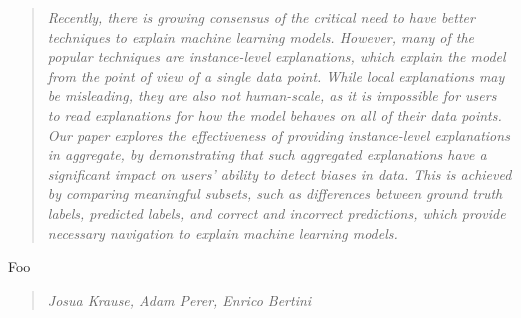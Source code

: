 \begin{quote}\textit{
Recently, there is growing consensus of the critical need to have better techniques to explain machine learning models.  However, many of the popular techniques are instance-level explanations, which explain the model from the point of view of a single data point.  While local explanations may be misleading, they are also not human-scale, as it is impossible for users to read explanations for how the model behaves on all of their data points.  Our paper explores the effectiveness of providing instance-level explanations in aggregate, by demonstrating that such aggregated explanations have a significant impact on users' ability to detect biases in data.
This is achieved by comparing meaningful subsets, such as differences between ground truth labels, predicted labels, and correct and incorrect predictions, which provide necessary navigation to explain machine learning models.
}
\end{quote}

\begin{contributions}{Foo}
\item {}
\end{contributions}

\begin{quote}
\textit{Josua Krause, Adam Perer, Enrico Bertini}
\end{quote}

